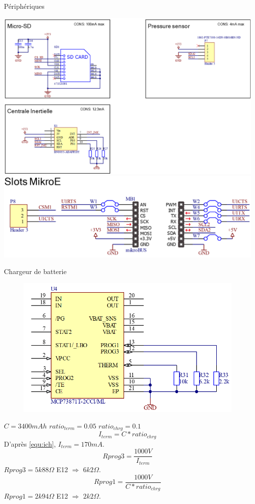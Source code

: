 \documentclass[compress,aspectratio=169]{beamer}
\begin{document}
\begin{frame}[containsverbatim]{Périphériques}
	 \par
	\noindent
	\includegraphics[width=0.49\linewidth]{Images/Dev-SCH/Periph1}
	\hfill
	\includegraphics[width=0.49\linewidth]{Images/Dev-SCH/Mikroe}
	\par	 
\end{frame}

\begin{frame}[containsverbatim]{Chargeur de batterie}
	\begin{figure}[h]
		\centering
		\includegraphics[width=0.3\linewidth]{Images/Dev-SCH/ChargeBat}
	\end{figure}
	$C = 3400mAh$ \quad $ratio_{term} = 0.05$ \quad $ratio_{chrg} = 0.1$\vspace{-2mm}
	\begin{equation} \label{equ:ich}
		I_{term} = C * ratio_{chrg} 
	\end{equation}
	D'après \ref{equ:ich}, $I_{term} = 170mA$.\vspace{-3mm}
	\begin{equation} \label{equ:Rprog3}
		Rprog3 = \frac{1000V}{I_{term}}
	\end{equation}
	$Rprog3 = 5k88 \Omega$ E12 $\Longrightarrow$ $6k2\Omega$.\vspace{-3mm}
	\begin{equation} \label{equ:Rprog1}
		Rprog1 = \frac{1000V}{C * ratio_{chrg}} 
	\end{equation} \vspace{-3mm}
	$Rprog1 = 2k94 \Omega$ E12 $\Longrightarrow$ $2k2\Omega$.
\end{frame}
\end{document}
